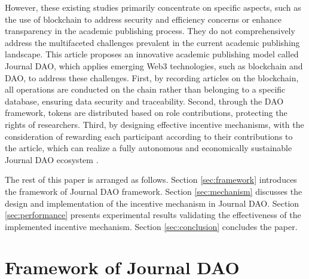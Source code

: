 \documentclass[lettersize,journal]{IEEEtran}
\begin{document}
However, these existing studies primarily concentrate on specific aspects, such as the use of blockchain to address security and efficiency concerns or enhance transparency in the academic publishing process. They do not comprehensively address the multifaceted challenges prevalent in the current academic publishing landscape. This article proposes an innovative academic publishing model called Journal DAO, which applies emerging Web3 technologies, such as blockchain and DAO, to address these challenges. First, by recording articles on the blockchain, all operations are conducted on the chain rather than belonging to a specific database, ensuring data security and traceability. Second, through the DAO framework, tokens are distributed based on role contributions, protecting the rights of researchers. Third, by designing effective incentive mechanisms, with the consideration of rewarding each participant according to their contributions to the article, which can realize a fully autonomous and economically sustainable Journal DAO ecosystem \cite{ding2022desci}.

The rest of this paper is arranged as follows. Section \ref{sec:framework} introduces the framework of Journal DAO framework. Section \ref{sec:mechanism} discusses the design and implementation of the incentive mechanism in Journal DAO. Section \ref{sec:performance} presents experimental results validating the effectiveness of the implemented incentive mechanism.
Section \ref{sec:conclusion} concludes the paper.


\section{Framework of Journal DAO \label{sec:framework}}








\end{document}
